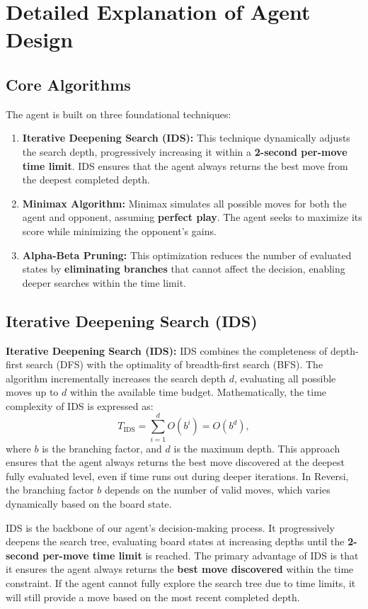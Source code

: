 \documentclass[11pt]{article}
\begin{document}
\section*{Detailed Explanation of Agent Design}

\subsection*{Core Algorithms}
The agent is built on three foundational techniques:
\begin{enumerate}
    \item \textbf{Iterative Deepening Search (IDS):} This technique dynamically adjusts the search depth, progressively increasing it within a \textbf{2-second per-move time limit}. IDS ensures that the agent always returns the best move from the deepest completed depth.
    \item \textbf{Minimax Algorithm:} Minimax simulates all possible moves for both the agent and opponent, assuming \textbf{perfect play}. The agent seeks to maximize its score while minimizing the opponent's gains.
    \item \textbf{Alpha-Beta Pruning:} This optimization reduces the number of evaluated states by \textbf{eliminating branches} that cannot affect the decision, enabling deeper searches within the time limit.
\end{enumerate}

\subsection*{Iterative Deepening Search (IDS)}
\noindent \textbf{Iterative Deepening Search (IDS):} IDS combines the completeness of depth-first search (DFS) with the optimality of breadth-first search (BFS). The algorithm incrementally increases the search depth \(d\), evaluating all possible moves up to \(d\) within the available time budget. Mathematically, the time complexity of IDS is expressed as:
\[
T_{\text{IDS}} = \sum_{i=1}^{d} O(b^i) = O(b^d),
\]
where \(b\) is the branching factor, and \(d\) is the maximum depth. This approach ensures that the agent always returns the best move discovered at the deepest fully evaluated level, even if time runs out during deeper iterations. In Reversi, the branching factor \(b\) depends on the number of valid moves, which varies dynamically based on the board state.

IDS is the backbone of our agent's decision-making process. It progressively deepens the search tree, evaluating board states at increasing depths until the \textbf{2-second per-move time limit} is reached. The primary advantage of IDS is that it ensures the agent always returns the \textbf{best move discovered} within the time constraint. If the agent cannot fully explore the search tree due to time limits, it will still provide a move based on the most recent completed depth.
\end{document}
